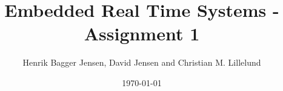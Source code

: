 \documentclass{article}
\title{Embedded Real Time Systems - Assignment 1}
\author{Henrik Bagger Jensen, David Jensen and Christian M. Lillelund}
\date{\today}
\begin{document}
\maketitle







{}
\end{document}
